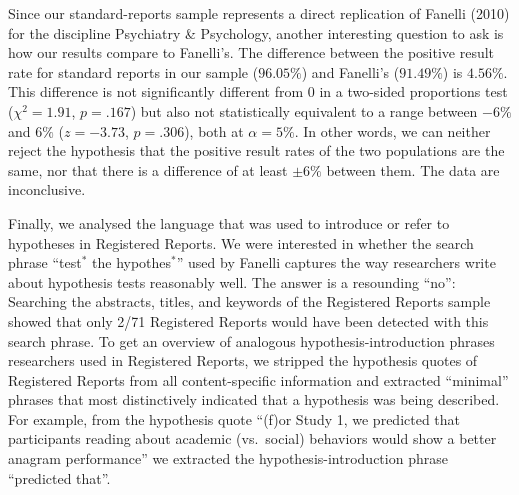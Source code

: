 \documentclass[british,,jou,floatsintext]{apa6}
\begin{document}
Since our standard-reports sample represents a direct replication of Fanelli (2010) for the discipline Psychiatry \& Psychology, another interesting question to ask is how our results compare to Fanelli's.
The difference between the positive result rate for standard reports in our sample (\(96.05\%\)) and Fanelli's (\(91.49\%\)) is \(4.56\%\). This difference is not significantly different from 0 in a two-sided proportions test (\(\chi^2 = 1.91\), \(p= .167\)) but also not statistically equivalent to a range between \(-6\%\) and \(6\%\) (\(z = -3.73\), \(p= .306\)), both at \(\alpha = 5\%\).
In other words, we can neither reject the hypothesis that the positive result rates of the two populations are the same, nor that there is a difference of at least \(\pm 6\%\) between them.
The data are inconclusive.

Finally, we analysed the language that was used to introduce or refer to hypotheses in Registered Reports.
We were interested in whether the search phrase \enquote{test\(^\ast\) the hypothes\(^\ast\)} used by Fanelli captures the way researchers write about hypothesis tests reasonably well. The answer is a resounding \enquote{no}:
Searching the abstracts, titles, and keywords of the Registered Reports sample showed that only 2/71 Registered Reports would have been detected with this search phrase.
To get an overview of analogous hypothesis-introduction phrases researchers used in Registered Reports, we stripped the hypothesis quotes of Registered Reports from all content-specific information and extracted \enquote{minimal} phrases that most distinctively indicated that a hypothesis was being described.
For example, from the hypothesis quote \enquote{(f)or Study 1, we predicted that participants reading about academic (vs.~social) behaviors would show a better anagram performance} we extracted the hypothesis-introduction phrase \enquote{predicted that}.
\end{document}
